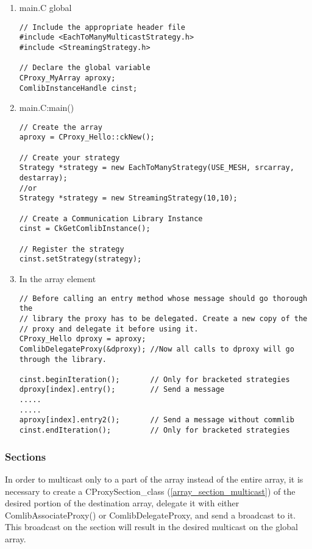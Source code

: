 \begin{enumerate}
\item main.C global
\begin{verbatim}
// Include the appropriate header file
#include <EachToManyMulticastStrategy.h>
#include <StreamingStrategy.h>

// Declare the global variable
CProxy_MyArray aproxy;
ComlibInstanceHandle cinst;
\end{verbatim}

\item main.C:main()
\begin{verbatim}
// Create the array
aproxy = CProxy_Hello::ckNew();

// Create your strategy
Strategy *strategy = new EachToManyStrategy(USE_MESH, srcarray, destarray);
//or
Strategy *strategy = new StreamingStrategy(10,10);

// Create a Communication Library Instance
cinst = CkGetComlibInstance();

// Register the strategy
cinst.setStrategy(strategy);
\end{verbatim}

\item In the array element 
\begin{verbatim}
// Before calling an entry method whose message should go thorough the
// library the proxy has to be delegated. Create a new copy of the
// proxy and delegate it before using it.
CProxy_Hello dproxy = aproxy;
ComlibDelegateProxy(&dproxy); //Now all calls to dproxy will go through the library.

cinst.beginIteration();       // Only for bracketed strategies
dproxy[index].entry();        // Send a message
.....
.....
aproxy[index].entry2();       // Send a message without commlib
cinst.endIteration();         // Only for bracketed strategies
\end{verbatim}
\end{enumerate}

\subsubsection{Sections}

In order to multicast only to a part of the array instead of the entire array,
it is necessary to create a {\textrm{CProxySection\_class}} (\ref{array_section_multicast}) of the desired
portion of the destination array, delegate it with either
{\textrm{ComlibAssociateProxy()}} or {\textrm{ComlibDelegateProxy}}, and send a
broadcast to it. This broadcast on the section will result in the desired
multicast on the global array.

